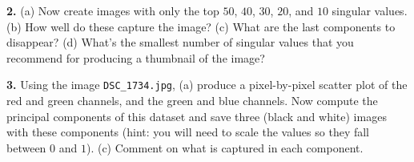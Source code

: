 \documentclass[12pt]{article}
\begin{document}
{\bf 2.} (a) Now create images with only the top $50$, $40$, $30$, $20$, and $10$ singular values.
(b) How well do these capture the image? (c) What are the last components to
disappear? (d) What's the smallest number of singular values that you recommend for producing
a thumbnail of the image?

{\bf 3.} Using the image \texttt{DSC\_1734.jpg}, (a) produce a pixel-by-pixel scatter
plot of the red and green channels, and the green and blue channels.
Now compute the principal components of this dataset and save three (black and white)
images with these components (hint: you will need to scale the values so they fall
between $0$ and $1$). (c) Comment on what is captured in each component.
\end{document}
